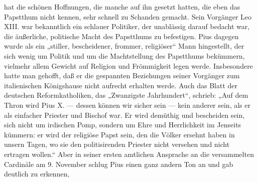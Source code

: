 hat die schönen Hoffnungen, die manche auf ihn gesetzt hatten, die eben das Papstthum nicht kennen, sehr schnell zu Schanden gemacht. Sein Vorgänger Leo XIII. war bekanntlich ein schlauer Politiker, der unablässig darauf bedacht war, die äußerliche, politische Macht des Papstthums zu befestigen. Pius dagegen wurde als ein „stiller, bescheidener, frommer, religiöser“ Mann hingestellt, der sich wenig um Politik und um die Machtstellung des Papstthums bekümmern, vielmehr allem Gewicht auf Religion und Frömmigkeit legen werde. Insbesondere hatte man gehofft, daß er die gespannten Beziehungen seiner Vorgänger zum italienischen Königshause nicht aufrecht erhalten werde. Auch das Blatt der deutschen Reformkatholiken, das „Zwanzigste Jahrhundert“, schrieb: „Auf dem Thron wird Pius X. — dessen können wir sicher sein — kein anderer sein, als er als einfacher Priester und Bischof war. Er wird demüthig und bescheiden sein, sich nicht um irdischen Pomp, sondern um Ehre und Herrlichkeit im Jenseits kümmern: er wird der religiöse Papst sein, den die Völker ersehnt haben in unsern Tagen, wo sie den politisirenden Priester nicht versehen und nicht ertragen wollen.“ Aber in seiner ersten amtlichen Ansprache an die versammelten Cardinäle am 9. November schlug Pius einen ganz andern Ton an und gab deutlich zu erkennen,
